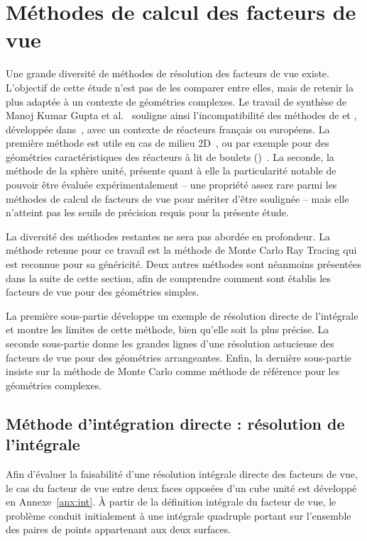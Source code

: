 \section{Méthodes de calcul des facteurs de vue}

Une grande diversité de méthodes de résolution des facteurs de vue existe. L'objectif de cette étude n'est pas de les comparer entre elles, mais de retenir la plus adaptée à un contexte de géométries complexes. Le travail de synthèse de Manoj Kumar Gupta et al.~\cite{methods_fv} souligne ainsi l'incompatibilité des méthodes de  et , développée dans~\cite{howell}, avec un contexte de réacteurs français ou européens. La première méthode est utile en cas de milieu 2D~\cite{Hajji2015}, ou par exemple pour des géométries caractéristiques des réacteurs à lit de boulets ()~\cite{pbr9}. La seconde, la méthode de la sphère unité, présente quant à elle la particularité notable de pouvoir être évaluée expérimentalement -- une propriété assez rare parmi les méthodes de calcul de facteurs de vue pour mériter d'être soulignée -- mais elle n'atteint pas les seuils de précision requis pour la présente étude.

La diversité des méthodes restantes ne sera pas abordée en profondeur. La méthode retenue pour ce travail est la méthode de Monte Carlo Ray Tracing qui est reconnue pour sa généricité. Deux autres méthodes sont néanmoins présentées dans la suite de cette section, afin de comprendre comment sont établis les facteurs de vue pour des géométries simples.

La première sous-partie développe un exemple de résolution directe de l'intégrale et montre les limites de cette méthode, bien qu'elle soit la plus précise. La seconde sous-partie donne les grandes lignes d'une résolution astucieuse des facteurs de vue pour des géométries arrangeantes. Enfin, la dernière sous-partie insiste sur la méthode de Monte Carlo comme méthode de référence pour les géométries complexes.

\subsection{Méthode d'intégration directe : résolution de l'intégrale}

Afin d'évaluer la faisabilité d'une résolution intégrale directe des facteurs de vue, le cas du facteur de vue entre deux faces opposées d'un cube unité est développé en Annexe~\ref{anx:int}. À partir de la définition intégrale du facteur de vue, le problème conduit initialement à une intégrale quadruple portant sur l'ensemble des paires de points appartenant aux deux surfaces.

